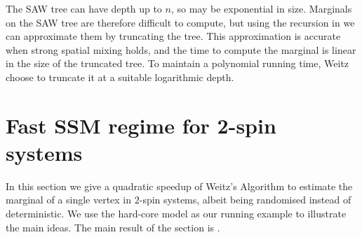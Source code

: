 \documentclass[11pt]{amsart}
\newcommand{\eps}{\varepsilon}
\newtheorem{theorem}{Theorem}
\theoremstyle{definition}
\theoremstyle{remark}
\begin{document}
The SAW tree can have depth up to $n$, so may be exponential in size. Marginals on the SAW tree are therefore difficult to compute, but using the recursion in  we can approximate them by truncating the tree. 
This approximation is accurate when strong spatial mixing holds,
and the time to compute the marginal is linear in the size of the truncated tree.
To maintain a polynomial running time, Weitz~\cite{Wei06} choose to truncate it at a suitable logarithmic depth.


\section{Fast SSM regime for 2-spin systems}
In this section we give a quadratic speedup of Weitz's Algorithm to estimate the marginal of a single vertex in $2$-spin systems, albeit being randomised instead of deterministic.
We use the hard-core model as our running example to illustrate the main ideas.
The main result of the section is .

\end{document}
